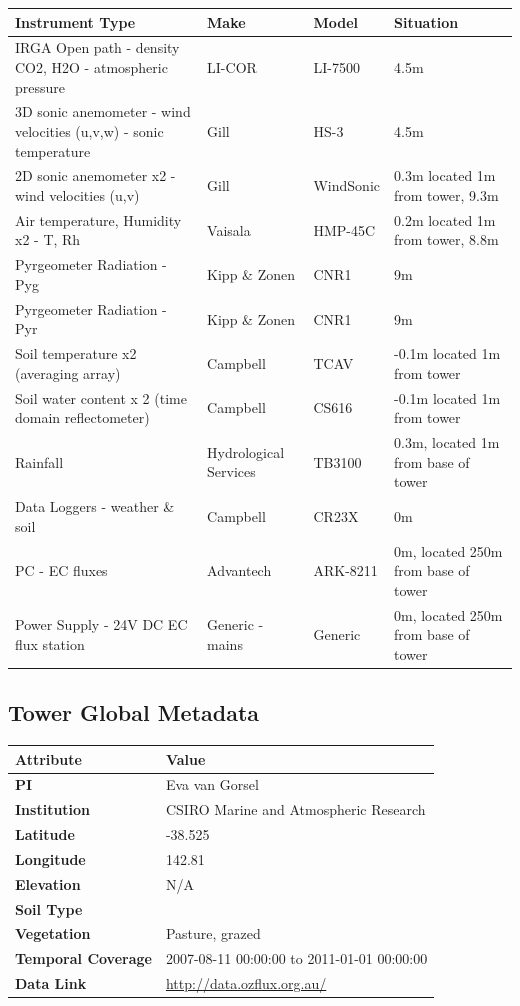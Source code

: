 \documentclass[11pt,a4paper]{article}
\begin{document}
\begin{longtable}{p{4.5cm}p{3.5cm}p{3.5cm}p{3.5cm}}
\toprule
\textbf{Instrument Type} & \textbf{Make} & \textbf{Model} & \textbf{Situation} \\
\midrule
\endhead
\bottomrule
\endfoot
IRGA Open path        - density CO2, H2O        - atmospheric pressure & LI-COR & LI-7500 & 4.5m \\
3D sonic anemometer       - wind velocities (u,v,w)        - sonic   temperature & Gill & HS-3 & 4.5m \\
2D sonic anemometer x2 - wind velocities (u,v) & Gill & WindSonic & 0.3m located 1m from tower, 9.3m \\
Air temperature, Humidity x2       - T, Rh & Vaisala & HMP-45C & 0.2m located 1m from tower, 8.8m \\
Pyrgeometer Radiation        - Pyg & Kipp \& Zonen & CNR1 & 9m \\
Pyrgeometer Radiation       - Pyr & Kipp \& Zonen & CNR1 & 9m \\
Soil temperature x2        (averaging array) & Campbell & TCAV & -0.1m located 1m from tower \\
Soil water content x 2        (time domain reflectometer) & Campbell & CS616 & -0.1m located  1m from tower \\
Rainfall & Hydrological Services & TB3100 & 0.3m, located 1m  from base of tower \\
Data Loggers       - weather \& soil & Campbell & CR23X & 0m \\
PC  - EC fluxes & Advantech & ARK-8211 & 0m, located 250m from base of tower \\
Power Supply       - 24V DC EC flux station & Generic       - mains & Generic & 0m, located 250m from base of tower \\
\end{longtable}


\subsection*{Tower Global Metadata}

\begin{longtable}{p{4.5cm}p{10.5cm}}
\toprule
\textbf{Attribute} & \textbf{Value} \\
\midrule
\endhead
\bottomrule
\endfoot
\textbf{PI} & Eva van Gorsel \\
\textbf{Institution} & CSIRO Marine and Atmospheric Research \\
\textbf{Latitude} & -38.525 \\
\textbf{Longitude} & 142.81 \\
\textbf{Elevation} & N/A \\
\textbf{Soil Type} &  \\
\textbf{Vegetation} & Pasture, grazed \\
\textbf{Temporal Coverage} & 2007-08-11 00:00:00 to 2011-01-01 00:00:00 \\
\textbf{Data Link} & \url{http://data.ozflux.org.au/} \\
\end{longtable}
\end{document}
